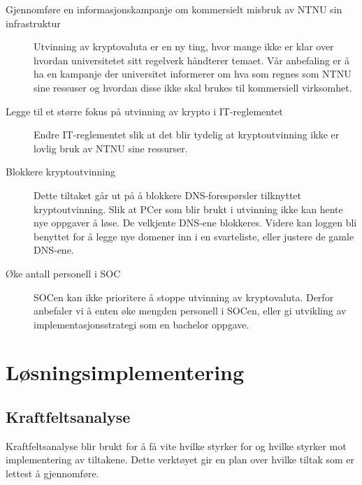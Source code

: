 \begin{description}
    \item[Gjennomføre en informasjonskampanje om kommersielt misbruk av NTNU sin infrastruktur] Utvinning av kryptovaluta er en ny ting, hvor mange ikke er klar over hvordan universitetet sitt regelverk håndterer temaet. Vår anbefaling er å ha en kampanje der universitet informerer om hva som regnes som NTNU sine ressuser og hvordan disse ikke skal brukes til kommersiell virksomhet.
    \item[Legge til et større fokus på utvinning av krypto i IT-reglementet] Endre IT-reglementet slik at det blir tydelig at kryptoutvinning ikke er lovlig bruk av NTNU sine ressurser. 
    \item[Blokkere kryptoutvinning] Dette tiltaket går ut på å blokkere DNS-forespørsler tilknyttet kryptoutvinning. Slik at PCer som blir brukt i utvinning ikke kan hente nye oppgaver å løse. De velkjente DNS-ene blokkeres. Videre kan loggen bli benyttet for å legge nye domener inn i en svarteliste, eller justere de gamle DNS-ene.
    \item[Øke antall personell i SOC] SOCen kan ikke prioritere å stoppe utvinning av kryptovaluta. Derfor anbefaler vi å enten øke mengden personell i SOCen, eller gi utvikling av implementasjonsstrategi som en bachelor oppgave.
\end{description}

\section{Løsningsimplementering}
\subsection{Kraftfeltsanalyse} 
Kraftfeltsanalyse blir brukt for å få vite hvilke styrker for og hvilke styrker mot implementering av tiltakene. Dette verktøyet gir en plan over hvilke tiltak som er lettest å gjennomføre.  

